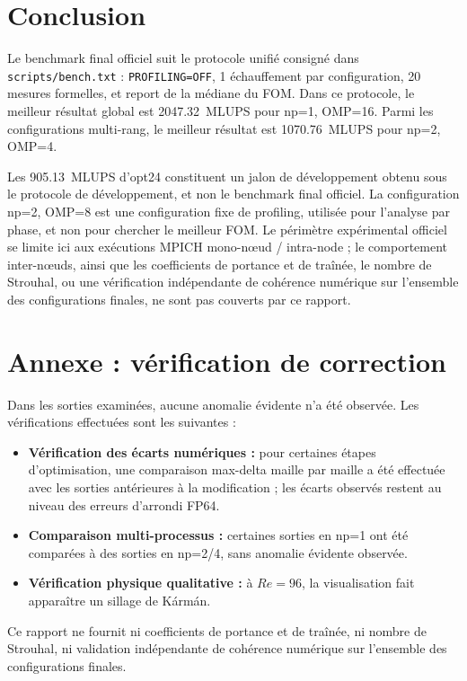 \documentclass[a4paper,11pt,oneside]{report}
\begin{document}
\section*{Conclusion}

Le benchmark final officiel suit le protocole unifié consigné dans \texttt{scripts/bench.txt} : \texttt{PROFILING=OFF}, 1 échauffement par configuration, 20 mesures formelles, et report de la médiane du FOM. Dans ce protocole, le meilleur résultat global est 2047.32~MLUPS pour np=1, OMP=16. Parmi les configurations multi-rang, le meilleur résultat est 1070.76~MLUPS pour np=2, OMP=4.

Les 905.13~MLUPS d'opt24 constituent un jalon de développement obtenu sous le protocole de développement, et non le benchmark final officiel. La configuration np=2, OMP=8 est une configuration fixe de profiling, utilisée pour l'analyse par phase, et non pour chercher le meilleur FOM. Le périmètre expérimental officiel se limite ici aux exécutions MPICH mono-nœud / intra-node ; le comportement inter-nœuds, ainsi que les coefficients de portance et de traînée, le nombre de Strouhal, ou une vérification indépendante de cohérence numérique sur l'ensemble des configurations finales, ne sont pas couverts par ce rapport.

\section*{Annexe : vérification de correction}

Dans les sorties examinées, aucune anomalie évidente n'a été observée. Les vérifications effectuées sont les suivantes :

\begin{itemize}
  \item \textbf{Vérification des écarts numériques :} pour certaines étapes d'optimisation, une comparaison max-delta maille par maille a été effectuée avec les sorties antérieures à la modification ; les écarts observés restent au niveau des erreurs d'arrondi FP64.
  \item \textbf{Comparaison multi-processus :} certaines sorties en np=1 ont été comparées à des sorties en np=2/4, sans anomalie évidente observée.
  \item \textbf{Vérification physique qualitative :} à $Re=96$, la visualisation fait apparaître un sillage de Kármán.
\end{itemize}

Ce rapport ne fournit ni coefficients de portance et de traînée, ni nombre de Strouhal, ni validation indépendante de cohérence numérique sur l'ensemble des configurations finales.
\end{document}
